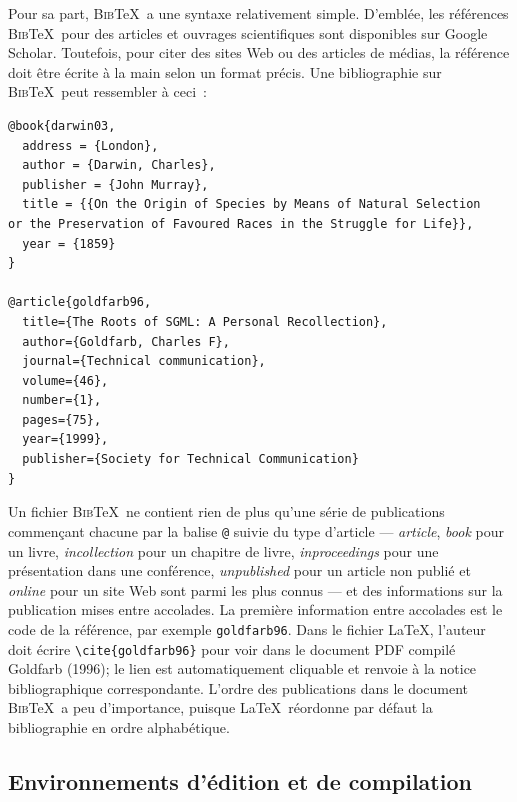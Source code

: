 \documentclass[
  letterpaper,
]{scrbook}
\begin{document}
Pour sa part, \textsc{Bib}\TeX~a une syntaxe relativement simple.
D'emblée, les références \textsc{Bib}\TeX~pour des articles et ouvrages
scientifiques sont disponibles sur Google Scholar. Toutefois, pour citer
des sites Web ou des articles de médias, la référence doit être écrite à
la main selon un format précis. Une bibliographie sur
\textsc{Bib}\TeX~peut ressembler à ceci~:

\begin{verbatim}
@book{darwin03,
  address = {London},
  author = {Darwin, Charles},
  publisher = {John Murray},
  title = {{On the Origin of Species by Means of Natural Selection
or the Preservation of Favoured Races in the Struggle for Life}},
  year = {1859}
}

@article{goldfarb96,
  title={The Roots of SGML: A Personal Recollection},
  author={Goldfarb, Charles F},
  journal={Technical communication},
  volume={46},
  number={1},
  pages={75},
  year={1999},
  publisher={Society for Technical Communication}
}
\end{verbatim}

Un fichier \textsc{Bib}\TeX~ne contient rien de plus qu'une série de
publications commençant chacune par la balise \texttt{@} suivie du type
d'article --- \emph{article}, \emph{book} pour un livre,
\emph{incollection} pour un chapitre de livre, \emph{inproceedings} pour
une présentation dans une conférence, \emph{unpublished} pour un article
non publié et \emph{online} pour un site Web sont parmi les plus connus
--- et des informations sur la publication mises entre accolades. La
première information entre accolades est le code de la référence, par
exemple \texttt{goldfarb96}. Dans le fichier \LaTeX, l'auteur doit
écrire \texttt{\textbackslash{}cite\{goldfarb96\}} pour voir dans le
document PDF compilé Goldfarb (1996); le lien est automatiquement
cliquable et renvoie à la notice bibliographique correspondante. L'ordre
des publications dans le document \textsc{Bib}\TeX~a peu d'importance,
puisque \LaTeX~réordonne par défaut la bibliographie en ordre
alphabétique.

\hypertarget{environnements-duxe9dition-et-de-compilation}{%
\subsection{Environnements d'édition et de
compilation}\label{environnements-duxe9dition-et-de-compilation}}
\end{document}
